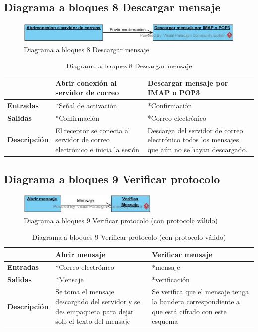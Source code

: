 \subsection{Diagrama a bloques 8 Descargar mensaje}
\begin{figure}[H]
	\includegraphics[width=1\linewidth, height=1cm]{./images/bloques8.jpg}
	\caption{Diagrama a bloques 8 Descargar mensaje}
	\label{fig:5-8-1}
\end{figure}
\begin{table}[H]
 \centering
   {
     \begin{tabular}{| p{3cm} | p{4cm} | p{4cm} |}
     \hline
     & \textbf{Abrir conexión al servidor de correo} & \textbf{Descargar mensaje por IMAP o POP3}\\
     \hline
     \textbf{Entradas} & *Señal de activación & *Confirmación\\
     \hline
     \textbf{Salidas} & *Confirmación & *Correo electrónico\\
     \hline
     \textbf{Descripción} & El receptor se conecta al servidor de correo electrónico e inicia la sesión & Descarga del servidor de correo electrónico todos los mensajes que aún no se hayan descargado.\\
	\hline
    \end{tabular}
    }
    \caption{Diagrama a bloques 8 Descargar mensaje}
    \label{tabla:b8}
\end{table}
\subsection{Diagrama a bloques 9 Verificar protocolo}
\begin{figure}[H]
	\includegraphics[width=1\linewidth, height=1cm]{./images/bloques9.jpg}
	\caption{Diagrama a bloques 9 Verificar protocolo (con protocolo válido)}
	\label{fig:5-9-1}
\end{figure}
\begin{table}[H]
 \centering
   {
     \begin{tabular}{| p{3cm} | p{4cm} | p{4cm} |}
     \hline
     & \textbf{Abrir mensaje} & \textbf{Verificar mensaje}\\
     \hline
     \textbf{Entradas} & *Correo electrónico & *mensaje\\
     \hline
     \textbf{Salidas} & *Mensaje & *verificación\\
     \hline
     \textbf{Descripción} & Se toma el mensaje descargado del servidor y se des empaqueta para dejar solo el texto del mensaje & Se verifica que el mensaje tenga la bandera correspondiente a que está cifrado con este esquema\\
	\hline
    \end{tabular}
    }
    \caption{Diagrama a bloques 9 Verificar protocolo (con protocolo válido)}
    \label{tabla:b9}
\end{table}
\pagebreak
